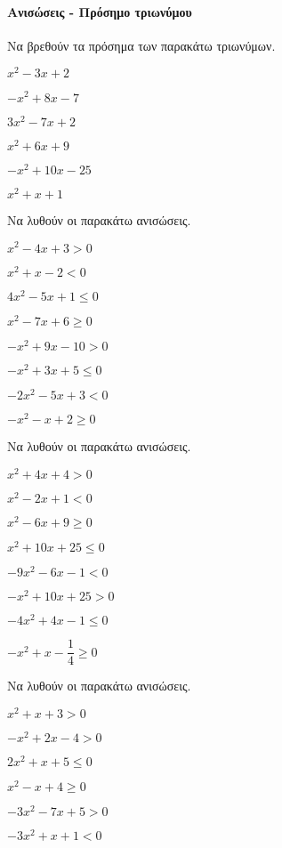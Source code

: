 \documentclass[11pt,a4paper,modern]{FFExercises}
\begin{document}
\paragraph{Ανισώσεις - Πρόσημο τριωνύμου}
\askhsh Να βρεθούν τα πρόσημα των παρακάτω τριωνύμων.
\begin{multicols}{2}
\begin{alist}
\item $ x^2-3x+2 $
\item $ -x^2+8x-7 $
\item $ 3x^2-7x+2 $
\item $ x^2+6x+9 $
\item $ -x^2+10x-25 $
\item $ x^2+x+1 $
\end{alist}
\end{multicols}
\askhsh Να λυθούν οι παρακάτω ανισώσεις.
\begin{multicols}{2}
\begin{alist}
\item $ x^2-4x+3>0 $
\item $ x^2+x-2<0 $
\item $ 4x^2-5x+1\leq0 $
\item $ x^2-7x+6\geq0 $
\item $ -x^2+9x-10>0 $
\item $ -x^2+3x+5\leq0 $
\item $ -2x^2-5x+3<0 $
\item $ -x^2-x+2\geq0 $
\end{alist}
\end{multicols}
\askhsh Να λυθούν οι παρακάτω ανισώσεις.
\begin{multicols}{2}
\begin{alist}
\item $ x^2+4x+4>0 $
\item $ x^2-2x+1<0 $
\item $ x^2-6x+9\geq0 $
\item $ x^2+10x+25\leq0 $
\item $ -9x^2-6x-1<0 $
\item $ -x^2+10x+25>0 $
\item $ -4x^2+4x-1\leq0 $
\item $ -x^2+x-\dfrac{1}{4}\geq0 $
\end{alist}
\end{multicols}
\askhsh Να λυθούν οι παρακάτω ανισώσεις.
\begin{multicols}{2}
\begin{alist}
\item $ x^2+x+3>0 $
\item $ -x^2+2x-4>0 $
\item $ 2x^2+x+5\leq0 $
\item $ x^2-x+4\geq0 $
\item $ -3x^2-7x+5>0 $
\item $ -3x^2+x+1<0 $
\end{alist}
\end{multicols}
\end{document}
